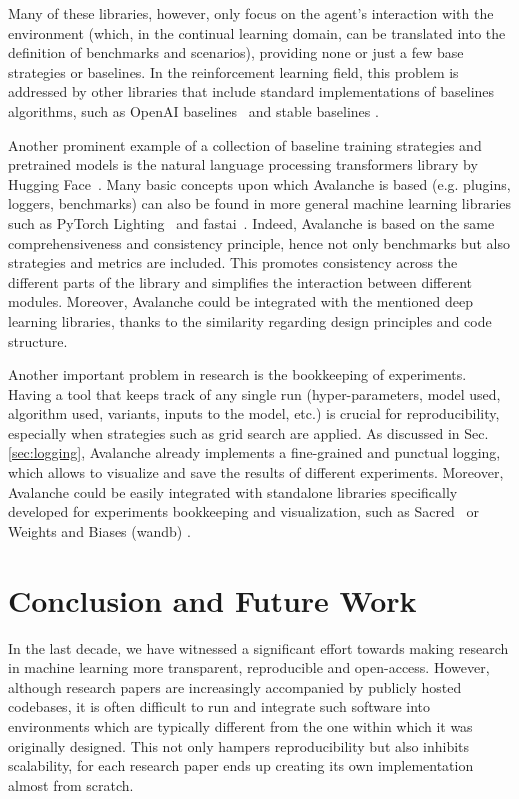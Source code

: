 \documentclass[final]{cvpr}
\theoremstyle{definition}
\begin{document}
Many of these libraries, however, only focus on the agent's interaction with the environment (which, in the continual learning domain, can be translated into the definition of benchmarks and scenarios), providing none or just a few base strategies or baselines. In the reinforcement learning field, this problem is addressed by other libraries that include standard implementations of baselines algorithms, such as OpenAI baselines~\cite{openAI-baselines} and stable baselines \cite{stable-baselines}. 

Another prominent example of a collection of baseline training strategies and pretrained models is the natural language processing transformers library by Hugging Face~\cite{hugginface}. Many basic concepts upon which Avalanche is based (e.g. plugins, loggers, benchmarks) can also be found in more general machine learning libraries such as PyTorch Lighting~\cite{falcon2019pytorch} and fastai~\cite{howard2020fastai}. Indeed, Avalanche is based on the same comprehensiveness and consistency principle, hence not only benchmarks but also strategies and metrics are included. This promotes consistency across the different parts of the library and simplifies the interaction between different modules. Moreover, Avalanche could be integrated with the mentioned deep learning libraries, thanks to the similarity regarding design principles and code structure. 

Another important problem in research is the bookkeeping of experiments. Having a tool that keeps track of any single run (hyper-parameters, model used, algorithm used, variants, inputs to the model, etc.) is crucial for reproducibility, especially when strategies such as grid search are applied.
As discussed in Sec. \ref{sec:logging}, Avalanche already implements a fine-grained and punctual logging, which allows to visualize and save the results of different experiments. Moreover, Avalanche could be easily integrated with standalone libraries specifically developed for experiments bookkeeping and visualization, such as Sacred~\cite{sacred} or Weights and Biases (wandb) \cite{wandb}.

\section{Conclusion and Future Work}
\label{sec:conclusion}

In the last decade, we have witnessed a significant effort towards making research in machine learning more transparent, reproducible and open-access. However, although research papers are increasingly accompanied by publicly hosted codebases, it is often difficult to run and integrate such software into environments which are typically different from the one within which it was originally designed. This not only hampers reproducibility but also inhibits scalability, for each research paper ends up creating its own implementation almost from scratch.
\end{document}
